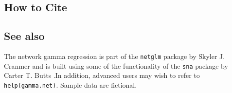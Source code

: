  \subsection* {How to Cite} 



\subsection* {See also}
The network gamma regression is part of the {\tt netglm} package by Skyler J. Cranmer and is built using some of the functionality of the  {\tt sna} package by Carter T. Butts \citep{ButCar01}.In addition, advanced users may wish to refer to {\tt help(gamma.net)}. Sample data are fictional. 
